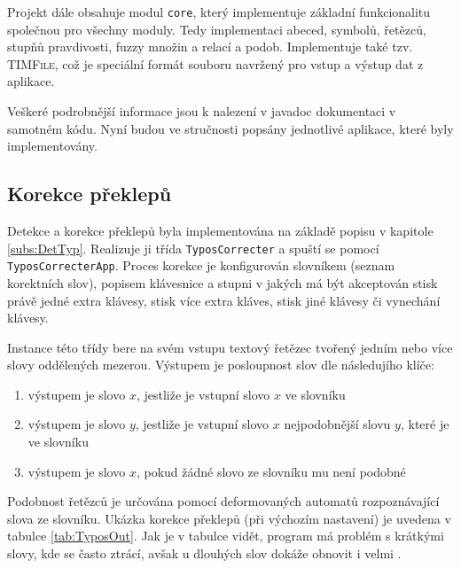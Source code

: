 \documentclass[a4paper,10pt]{article}
\begin{document}
Projekt dále obsahuje modul \verb|core|, který implementuje základní funkcionalitu společnou pro všechny moduly. Tedy implementaci abeced, symbolů, řetězců, stupňů pravdivosti, fuzzy množin a relací a podob. Implementuje také tzv. \textsc{TIMFile}, což je speciální formát souboru navržený pro vstup a výstup dat z aplikace.

Veškeré podrobnější informace jsou k nalezení v javadoc dokumentaci v samotném kódu. Nyní budou ve stručnosti popsány jednotlivé aplikace, které byly implementovány.


\subsection{Korekce překlepů}
Detekce a korekce překlepů byla implementována na základě popisu v kapitole \ref{subs:DetTyp}. Realizuje ji třída \verb|TyposCorrecter| a spuští se pomocí \verb|TyposCorrecterApp|. Proces korekce je konfigurován slovníkem (seznam korektních slov), popisem klávesnice a stupni v jakých má být akceptován stisk právě jedné extra klávesy, stisk více extra kláves, stisk jiné klávesy či vynechání klávesy.

Instance této třídy bere na svém vstupu textový řetězec tvořený jedním nebo více slovy oddělených mezerou. Výstupem je posloupnost slov dle následujího klíče:
\begin{enumerate}
 \item výstupem je slovo $x$, jestliže je vstupní slovo $x$ ve slovníku
 \item výstupem je slovo $y$, jestliže je vstupní slovo $x$ nejpodobnější slovu $y$, které je ve slovníku
 \item výstupem je slovo $x$, pokud žádné slovo ze slovníku mu není podobné
\end{enumerate}

Podobnost řetězců je určována pomocí deformovaných automatů rozpoznávající slova ze slovníku. Ukázka korekce překlepů (při výchozím nastavení) je uvedena v tabulce \ref{tab:TyposOut}. Jak je v tabulce vidět, program má problém s krátkými slovy, kde se často ztrácí, avšak u dlouhých slov dokáže obnovit i velmi .
\end{document}
